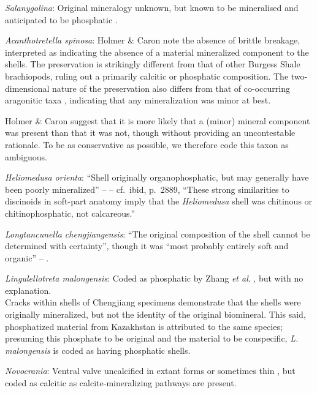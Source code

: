 \documentclass[]{book}
\theoremstyle{definition}
\theoremstyle{definition}
\theoremstyle{definition}
\theoremstyle{remark}
\begin{document}
\emph{Salanygolina}: Original mineralogy unknown, but known to be
mineralised and anticipated to be phosphatic
\citep{Holmer2009Theenigmatic}.

\emph{Acanthotretella spinosa}: Holmer \& Caron
\citeyearpar{Holmer2006Aspinose} note the absence of brittle breakage,
interpreted as indicating the absence of a material mineralized
component to the shells. The preservation is strikingly different from
that of other Burgess Shale brachiopods, ruling out a primarily calcitic
or phosphatic composition. The two-dimensional nature of the
preservation also differs from that of co-occurring aragonitic taxa
\citep[hyoliths;][ p.~273]{Holmer2006Aspinose}, indicating that any
mineralization was minor at best.

Holmer \& Caron \citeyearpar[p.~286]{Holmer2006Aspinose} suggest that it
is more likely that a (minor) mineral component was present than that it
was not, though without providing an uncontestable rationale. To be as
conservative as possible, we therefore code this taxon as ambiguous.

\emph{Heliomedusa orienta}: ``Shell originally organophosphatic, but may
generally have been poorly mineralized'' -- \citet{Williams2007PartH} --
cf.~ibid, p.~2889, ``These strong similarities to discinoids in
soft-part anatomy imply that the \emph{Heliomedusa} shell was chitinous
or chitinophosphatic, not calcareous.''

\emph{Longtancunella chengjiangensis}: ``The original composition of the
shell cannot be determined with certainty'', though it was ``most
probably entirely soft and organic'' --
\citet{Zhang2011Theexceptionally}.

\emph{Lingulellotreta malongensis}: Coded as phosphatic by Zhang
\emph{et al}. \citeyearpar{Zhang2014Anearly}, but with no explanation.\\
Cracks within shells of Chengjiang specimens \citep[e.g.][fig.
3]{Zhang2007Noteon} demonstrate that the shells were originally
mineralized, but not the identity of the original biomineral. This said,
phosphatized material from Kazakhstan \citep{Holmer1997EarlyCambrian} is
attributed to the same species; presuming this phosphate to be original
and the material to be conspecific, \emph{L. malongensis} is coded as
having phosphatic shells.

\emph{Novocrania}: Ventral valve uncalcified in extant forms or
sometimes thin \citep{Williams2000BrachiopodaLinguliformea}, but coded
as calcitic as calcite-mineralizing pathways are present.
\end{document}
